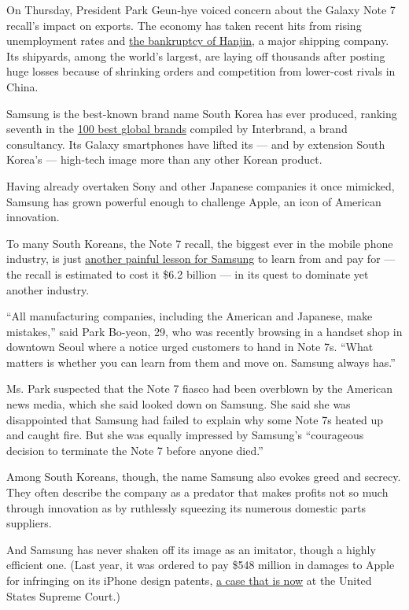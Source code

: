 On Thursday, President Park Geun-hye voiced concern about the Galaxy
Note 7 recall's impact on exports. The economy has taken recent hits
from rising unemployment rates and
\href{http://www.nytimes.com/2016/09/16/business/dealbook/lack-of-planning-hampers-hanjin-shipping-bankruptcy.html}{the
bankruptcy of Hanjin}, a major shipping company. Its shipyards, among
the world's largest, are laying off thousands after posting huge losses
because of shrinking orders and competition from lower-cost rivals in
China.

Samsung is the best-known brand name South Korea has ever produced,
ranking seventh in the
\href{http://interbrand.com/best-brands/best-global-brands/2016/ranking/}{100
best global brands} compiled by Interbrand, a brand consultancy. Its
Galaxy smartphones have lifted its --- and by extension South Korea's
--- high-tech image more than any other Korean product.

Having already overtaken Sony and other Japanese companies it once
mimicked, Samsung has grown powerful enough to challenge Apple, an icon
of American innovation.

To many South Koreans, the Note 7 recall, the biggest ever in the mobile
phone industry, is just
\href{http://www.nytimes.com/2016/10/13/business/international/samsung-galaxy-note7-profit-battery-fires.html}{another
painful lesson for Samsung} to learn from and pay for --- the recall is
estimated to cost it \$6.2 billion --- in its quest to dominate yet
another industry.

``All manufacturing companies, including the American and Japanese, make
mistakes,'' said Park Bo-yeon, 29, who was recently browsing in a
handset shop in downtown Seoul where a notice urged customers to hand in
Note 7s. ``What matters is whether you can learn from them and move on.
Samsung always has.''

Ms. Park suspected that the Note 7 fiasco had been overblown by the
American news media, which she said looked down on Samsung. She said she
was disappointed that Samsung had failed to explain why some Note 7s
heated up and caught fire. But she was equally impressed by Samsung's
``courageous decision to terminate the Note 7 before anyone died.''

Among South Koreans, though, the name Samsung also evokes greed and
secrecy. They often describe the company as a predator that makes
profits not so much through innovation as by ruthlessly squeezing its
numerous domestic parts suppliers.

And Samsung has never shaken off its image as an imitator, though a
highly efficient one. (Last year, it was ordered to pay \$548 million in
damages to Apple for infringing on its iPhone design patents,
\href{http://www.nytimes.com/2016/03/22/technology/supreme-court-to-hear-samsung-appeal-on-apple-patent-award.html}{a
case that is now} at the United States Supreme Court.)

